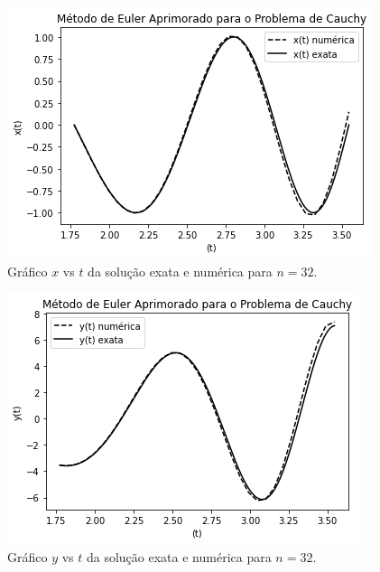 \documentclass[amsmath,amssymb,floatfix]{revtex4}
\begin{document}
\begin{figure}[H]
\centering
\includegraphics[scale=0.56]{aprix_num_exata}
\caption{Gráfico $x$ vs $t$ da solução exata e numérica para $n=32$.}
\label{aprix}
\end{figure}

\begin{figure}[H]
\centering
\includegraphics[scale=0.56]{apriy_num_exata}
\caption{Gráfico $y$ vs $t$ da solução exata e numérica para $n=32$.}
\label{apriy}
\end{figure}
\end{document}
